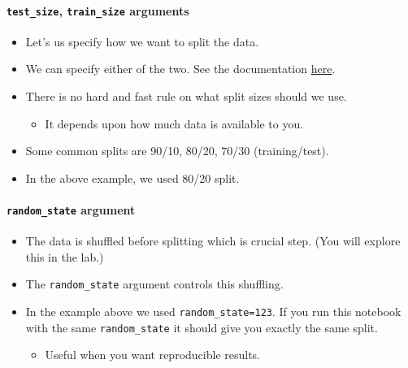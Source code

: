 \documentclass[11pt]{article}
\providecommand{\tightlist}{%
      \setlength{\itemsep}{0pt}\setlength{\parskip}{0pt}}
\begin{document}
    \paragraph{\texorpdfstring{\texttt{test\_size}, \texttt{train\_size}
arguments}{test\_size, train\_size arguments}}\label{test_size-train_size-arguments}

\begin{itemize}
\tightlist
\item
  Let's us specify how we want to split the data.
\item
  We can specify either of the two. See the documentation
  \href{https://scikit-learn.org/stable/modules/generated/sklearn.model_selection.train_test_split.html}{here}.
\item
  There is no hard and fast rule on what split sizes should we use.

  \begin{itemize}
  \tightlist
  \item
    It depends upon how much data is available to you.
  \end{itemize}
\item
  Some common splits are 90/10, 80/20, 70/30 (training/test).
\item
  In the above example, we used 80/20 split.
\end{itemize}

    \paragraph{\texorpdfstring{\texttt{random\_state}
argument}{random\_state argument}}\label{random_state-argument}

\begin{itemize}
\tightlist
\item
  The data is shuffled before splitting which is crucial step. (You will
  explore this in the lab.)
\item
  The \texttt{random\_state} argument controls this shuffling.
\item
  In the example above we used \texttt{random\_state=123}. If you run
  this notebook with the same \texttt{random\_state} it should give you
  exactly the same split.

  \begin{itemize}
  \tightlist
  \item
    Useful when you want reproducible results.
  \end{itemize}
\end{itemize}
\end{document}
